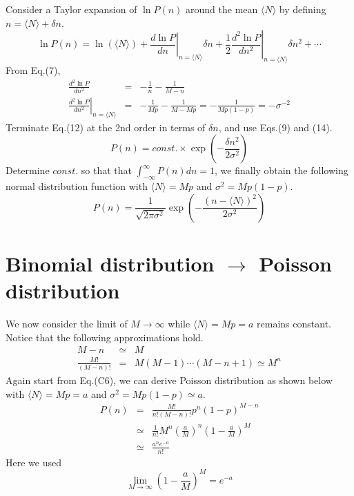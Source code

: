 \documentclass[a4paper,11pt]{article}
\begin{document}
Consider a Taylor expansion of $\ln P(n)$ around the mean $\langle N\rangle$ by defining $n=\langle N\rangle+\delta n$.
\begin{equation}
  \ln P(n) = \ln (\langle N\rangle) + \left.\frac{d \ln P}{dn}\right|_{n=\langle N\rangle}\delta n
  + \frac{1}{2}\left.\frac{d^2 \ln P}{dn^2}\right|_{n=\langle N\rangle}\delta n^2 + \cdots
  \end{equation}
From Eq.(7),
\begin{eqnarray}
  \frac{d^2 \ln P}{dn^2}&=&-\frac{1}{n}-\frac{1}{M-n}\\
  \left.\frac{d^2 \ln P}{dn^2}\right|_{n=\langle N\rangle}&=&-\frac{1}{Mp}-\frac{1}{M-Mp}=-\frac{1}{Mp(1-p)}=-\sigma^{-2}
\end{eqnarray}
Terminate Eq.(12) at the 2nd order in terms of  $\delta n$, and use Eqs.(9) and (14). 
\begin{equation}
P(n)=const.\times\exp\left(-\frac{\delta n^2}{2\sigma^2}\right)
\end{equation}
Determine $const.$ so that that $\int_{-\infty}^{\infty}P(n)dn=1$, we finally obtain the following normal distribution function with $\langle N\rangle=Mp$ and $\sigma^2=Mp(1-p)$.
\begin{equation}
P(n)=\frac{1}{\sqrt{2\pi\sigma^2}}\exp\left(-\frac{(n-\langle N\rangle)^2}{2\sigma^2}\right)
\end{equation}

\section{Binomial distribution $\rightarrow$ Poisson distribution}

We now consider the limit of $M\rightarrow\infty$ while $\langle N\rangle=Mp=a$ remains constant.
Notice that the following approximations hold.
\begin{eqnarray}
M-n&\simeq& M\\
  \frac{M!}{(M-n)!}&=&M(M-1)\cdots(M-n+1)\simeq M^n
\end{eqnarray}
Again start from Eq.(C6), we can derive Poisson distribution as shown below
with $\langle N\rangle=Mp=a$ and $\sigma^2=Mp(1-p)\simeq a$.
\begin{eqnarray}
  P(n)&=&\frac{M!}{n!(M-n)!}p^n(1-p)^{M-n}\\
  &\simeq&\frac{1}{n!}M^n\left(\frac{a}{M}\right)^n\left(1-\frac{a}{M}\right)^M\\
  &\simeq&\frac{a^n e^{-a}}{n!}
\end{eqnarray}
Here we used
\begin{equation}
\lim_{M\rightarrow \infty}\left(1-\frac{a}{M}\right)^M= e^{-a}
\end{equation}
\end{document}
